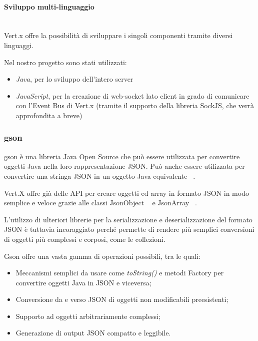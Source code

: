 \paragraph{Sviluppo multi-linguaggio}\mbox{}\\
Vert.x offre la possibilità di sviluppare i singoli componenti tramite diversi linguaggi.\newline

Nel nostro progetto sono stati utilizzati:
\begin{itemize}
    \item {\emph{Java}, per lo sviluppo dell'intero server}
    \item{\emph{JavaScript}, per la creazione di web-socket lato client in grado di comunicare con l'Event Bus di Vert.x (tramite il supporto della libreria SockJS, che verrà approfondita a breve)}
\end{itemize}

\subsubsection{gson}
gson è una libreria Java Open Source che può essere utilizzata per convertire oggetti Java nella loro rappresentazione JSON.\newline
Può anche essere utilizzata per convertire una stringa JSON in un oggetto Java equivalente
~\cite{gsonIniz52:online}.\newline

\noindent Vert.X offre già delle API per creare oggetti ed array in formato JSON in modo semplice e veloce grazie alle classi JsonObject ~\cite{JsonObj:online} e JsonArray ~\cite{JsonArr:online}.\newline

\noindent L'utilizzo di ulteriori librerie per la serializzazione e deserializzazione del formato JSON è tuttavia incoraggiato perché permette di rendere più semplici conversioni di oggetti più complessi e corposi, come le collezioni.

\noindent Gson offre una vasta gamma di operazioni possibili, tra le quali:

\begin{itemize}
\item Meccanismi semplici da usare come \textit{toString()} e metodi Factory per convertire oggetti Java in JSON e viceversa;

\item Conversione da e verso JSON di oggetti non modificabili preesistenti;

\item Supporto ad oggetti arbitrariamente complessi;
\item Generazione di output JSON compatto e leggibile.
\end{itemize}

